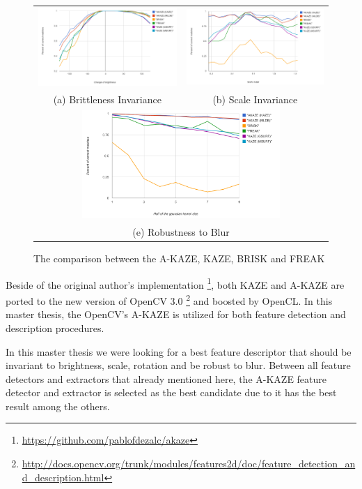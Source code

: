 \begin{figure}[H]
\begin{tabular}{cc}
  \includegraphics[width=75mm]{figures/brithness_akaze} &  \includegraphics[width=75mm]{figures/scale_akaze} \\
(a) Brittleness Invariance & (b) Scale Invariance \\[6pt]
\multicolumn{2}{c}{\includegraphics[width=75mm]{figures/blur_akaze} }\\
\multicolumn{2}{c}{(e) Robustness to Blur}
\end{tabular}
\caption{The comparison between the A-KAZE, KAZE, BRISK and FREAK}\label{fig:compare_kaze_and_A-kaze}
\end{figure}

Beside of the original author's implementation \footnote{\url{https://github.com/pablofdezalc/akaze}}, both KAZE and A-KAZE are ported to the new version of OpenCV 3.0  \footnote{\url{http://docs.opencv.org/trunk/modules/features2d/doc/feature_detection_and_description.html}} and boosted by OpenCL. In this master thesis, the OpenCV's A-KAZE is utilized for both feature detection and description procedures. 

In this master thesis we were looking for a best feature descriptor that should be invariant to brightness, scale, rotation and be robust to blur. Between all feature detectors and extractors that already mentioned here, the A-KAZE feature detector and extractor is selected as the best candidate due to it has the best result among the others.


